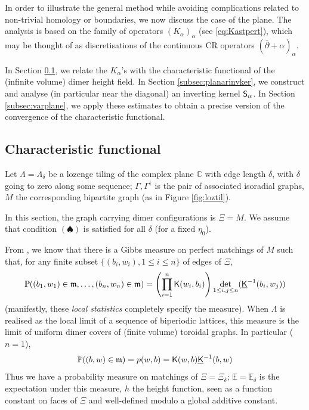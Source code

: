 \documentclass[10pt]{article}
\newcommand{\C}{\mathbb{C}}
\newcommand{\E}{\mathbb{E}}
\renewcommand{\P}{\mathbb{P}}
\newcommand{\rK}{{\sf K}}
\newcommand{\uK}{{\underline {\sf K}}}
\newcommand{\rS}{{\sf S}}
\newcommand{\dg}{\dagger}
\newcommand{\mfm}{{\mathfrak m}}
\newcommand{\dbar}{\bar\partial}
\begin{document}
In order to illustrate the general method while avoiding complications related to non-trivial homology or boundaries, we now discuss the case of the plane. The analysis is based on the family of operators $(K_\alpha)_\alpha$ (see \eqref{eq:Kastpert}), which may be thought of as discretisations of the continuous CR operators $(\dbar+\alpha)_\alpha$. 

In Section \ref{subsec:planecharfun}, we relate the $K_\alpha$'s with the characteristic functional of the (infinite volume) dimer height field. In Section \ref{subsec:planarinvker}, we construct and analyse (in particular near the diagonal) an inverting kernel $\rS_\alpha$. In Section \ref{subsec:varplane}, we apply these estimates to obtain a precise version of the convergence of the characteristic functional. 


\subsection{Characteristic functional}\label{subsec:planecharfun}

Let $\Lambda=\Lambda_\delta$ be a lozenge tiling of the complex plane $\C$ with edge length $\delta$, with $\delta$ going to zero along some sequence; $\Gamma,\Gamma^\dg$ is the pair of associated isoradial graphs, $M$ the corresponding bipartite graph (as in Figure \ref{fig:loztil}).

In this section, the graph carrying dimer configurations is $\Xi=M$. We assume that condition $(\spadesuit)$ is satisfied for all $\delta$ (for a fixed $\eta_0$). 

From \cite{Ken_locstat,KOS,dT_quadri}, we know that there is a Gibbs measure on perfect matchings of $M$ such that, for any finite subset $\{(b_i,w_i),1\leq i\leq n\}$ of edges of $\Xi$, 
\begin{equation}\label{eq:locstats}
\P((b_1,w_1)\in\mfm,\dots,(b_n,w_n)\in\mfm)=\left(\prod_{i=1}^n\rK(w_i,b_i)\right)\det_{1\leq i,j\leq n}(\uK^{-1}(b_i,w_j))
\end{equation}
(manifestly, these {\em local statistics} completely specify the measure). When $\Lambda$ is realised as the local limit of a sequence of biperiodic lattices, this measure is the limit of uniform dimer covers of (finite volume) toroidal graphs. In particular ($n=1$),
$$\P((b,w)\in\mfm)=p(w,b)=\rK(w,b)\uK^{-1}(b,w)$$
Thus we have a probability measure on matchings of $\Xi=\Xi_\delta$; $\E=\E_\delta$ is the expectation under this measure, $h$ the height function, seen as a function constant on faces of $\Xi$ and well-defined modulo a global additive constant.   
\end{document}
